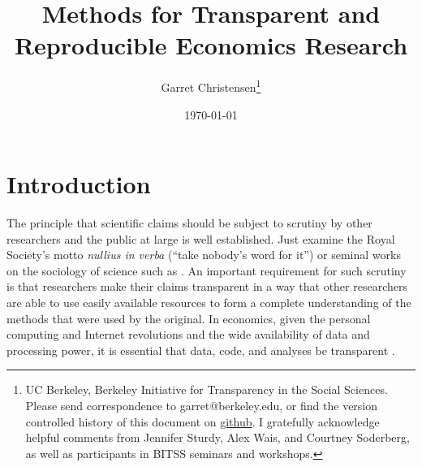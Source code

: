 \documentclass[12pt] {article}
\begin{document}
\title{Methods for Transparent and Reproducible Economics Research}

\author{Garret Christensen\footnote{UC Berkeley, Berkeley Initiative for Transparency in the Social Sciences. Please send correspondence to garret@berkeley.edu, or find the version controlled history of this document on \href{https://github.com/garretchristensen/BestPracticesManual}{github}. I gratefully acknowledge helpful comments from Jennifer Sturdy, Alex Wais, and Courtney Soderberg, as well as participants in BITSS seminars and workshops.}}
\date{\today}
\maketitle




\newpage
\section{Introduction}\label{introduction}

The principle that scientific claims should be subject to scrutiny by other researchers and
the public at large is well established.  Just examine the Royal Society's motto \textit{nullius in verba} (``take nobody's word for it'') or seminal works on the sociology of science such as  \cite{merton1973sociology}. An important requirement for such scrutiny is that
researchers make their claims transparent in a way that other
researchers are able to use easily available resources to form a
complete understanding of the methods that were used by the original. In
economics, given the personal computing and Internet revolutions and the wide availability of data and processing power, it is essential that data, code, and analyses be transparent \citep{marwick_how}.
\end{document}
